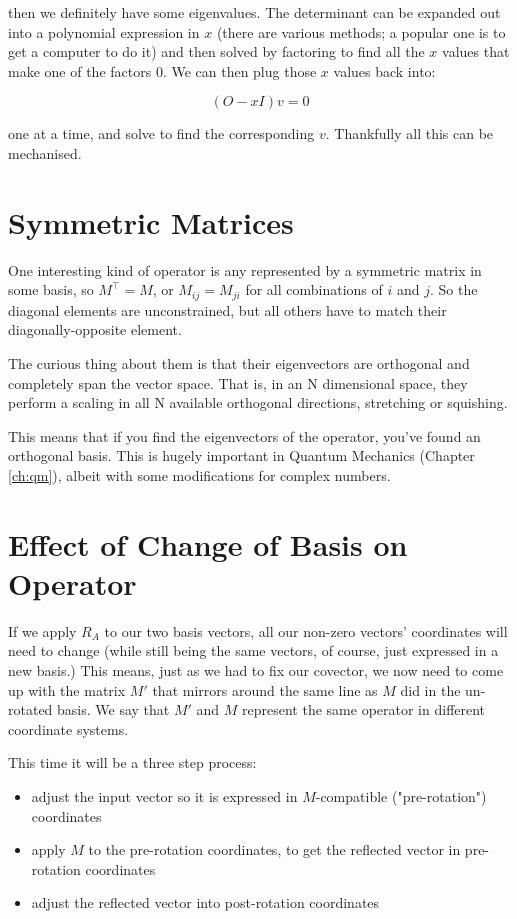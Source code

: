 then we definitely have some eigenvalues. The determinant can be expanded out into a polynomial expression in $x$ (there are various methods; a popular one is to get a computer to do it) and then solved by factoring to find all the $x$ values that make one of the factors $0$. We can then plug those $x$ values back into:

$$(O - xI)v = 0$$

one at a time, and solve to find the corresponding $v$. Thankfully all this can be mechanised.

\section{Symmetric Matrices}\label{ch:vectors-symmetric}

One interesting kind of operator is any represented by a symmetric matrix in some basis, so $M^\intercal = M$, or $M_{ij} = M_{ji}$ for all combinations of $i$ and $j$. So the diagonal elements are unconstrained, but all others have to match their diagonally-opposite element.

The curious thing about them is that their eigenvectors are orthogonal and completely span the vector space. That is, in an N dimensional space, they perform a scaling in all N available orthogonal directions, stretching or squishing.

This means that if you find the eigenvectors of the operator, you've found an orthogonal basis. This is hugely important in Quantum Mechanics (Chapter \ref{ch:qm}), albeit with some modifications for complex numbers.

\section{Effect of Change of Basis on Operator}

If we apply $R_A$ to our two basis vectors, all our non-zero vectors' coordinates will need to change (while still being the same vectors, of course, just expressed in a new basis.) This means, just as we had to fix our covector, we now need to come up with the matrix $M'$ that mirrors around the same line as $M$ did in the un-rotated basis. We say that $M'$ and $M$ represent the same operator in different coordinate systems.

This time it will be a three step process:

\begin{itemize}
    \item adjust the input vector so it is expressed in $M$-compatible ("pre-rotation") coordinates
    \item apply $M$ to the pre-rotation coordinates, to get the reflected vector in pre-rotation coordinates
    \item adjust the reflected vector into post-rotation coordinates
\end{itemize}

